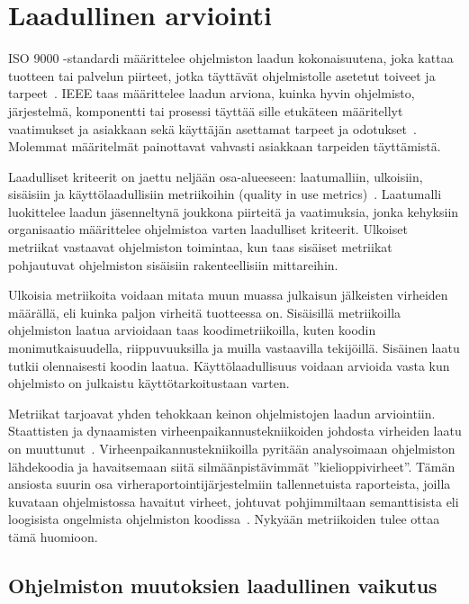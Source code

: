 \documentclass[finnish]{../tktltiki2}
\theoremstyle{definition}
\theoremstyle{remark}
\begin{document}
\section{Laadullinen arviointi}

ISO 9000 -standardi määrittelee ohjelmiston laadun kokonaisuutena, joka kattaa tuotteen tai palvelun piirteet, jotka 
täyttävät ohjelmistolle asetetut toiveet ja tarpeet~\cite{ISO9000}. IEEE taas määrittelee laadun arviona, kuinka hyvin 
ohjelmisto, järjestelmä, komponentti tai prosessi täyttää sille etukäteen määritellyt vaatimukset ja asiakkaan sekä 
käyttäjän asettamat tarpeet ja odotukset~\cite{IEEE1074}. Molemmat määritelmät painottavat vahvasti asiakkaan tarpeiden 
täyttämistä.

    Laadulliset kriteerit on jaettu neljään osa-alueeseen: laatumalliin, ulkoisiin, sisäisiin ja käyttölaadullisiin 
metriikoihin (quality in use metrics)~\cite{ISO25010}. Laatumalli luokittelee laadun jäsenneltynä joukkona piirteitä ja 
vaatimuksia, jonka kehyksiin organisaatio määrittelee ohjelmistoa varten laadulliset kriteerit. Ulkoiset metriikat 
vastaavat ohjelmiston toimintaa, kun taas sisäiset metriikat pohjautuvat ohjelmiston sisäisiin rakenteellisiin 
mittareihin.

    Ulkoisia metriikoita voidaan mitata muun muassa julkaisun jälkeisten virheiden määrällä, eli kuinka paljon virheitä 
tuotteessa on. Sisäisillä metriikoilla ohjelmiston laatua arvioidaan taas koodimetriikoilla, kuten koodin 
monimutkaisuudella, riippuvuuksilla ja muilla vastaavilla tekijöillä. Sisäinen laatu tutkii olennaisesti koodin laatua. 
Käyttölaadullisuus voidaan arvioida vasta kun ohjelmisto on julkaistu käyttötarkoitustaan varten.

    Metriikat tarjoavat yhden tehokkaan keinon ohjelmistojen laadun arviointiin. Staattisten ja dynaamisten 
virheenpaikannustekniikoiden johdosta virheiden laatu on muuttunut~\cite{ZN08}. Virheenpaikannustekniikoilla pyritään 
analysoimaan ohjelmiston lähdekoodia ja havaitsemaan siitä silmäänpistävimmät ''kielioppivirheet''. Tämän ansiosta 
suurin osa virheraportointijärjestelmiin tallennetuista raporteista, joilla kuvataan ohjelmistossa havaitut virheet, 
johtuvat pohjimmiltaan semanttisista eli loogisista ongelmista ohjelmiston koodissa~\cite{ZN08}. Nykyään metriikoiden 
tulee ottaa tämä huomioon.

\subsection{Ohjelmiston muutoksien laadullinen vaikutus}
\end{document}
